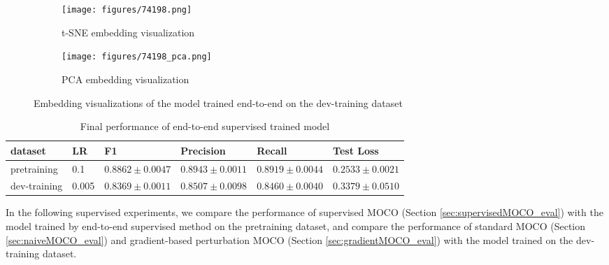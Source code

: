 \documentclass[12pt,twoside]{report}
\begin{document}
\begin{figure}
\centering
    \begin{subfigure}{.45\textwidth}
      \centering
      \texttt{[image: figures/74198.png]}
      \caption{t-SNE embedding visualization}
      \label{fig:small_supervised_tsne}
    \end{subfigure}%
    \begin{subfigure}{.45\textwidth}
      \centering
      \texttt{[image: figures/74198\_pca.png]}
      \caption{PCA embedding visualization}
      \label{fig:small_supervised_pca}
    \end{subfigure}
    \caption{Embedding visualizations of the model trained end-to-end on the dev-training dataset}
    \label{fig:small_supervised_embedding}
\end{figure}



\begin{table}[]
    \centering
    \begin{tabular}{llllll}
    \toprule
    dataset & LR & F1 & Precision & Recall & Test Loss \\
    \midrule
    pretraining & 0.1 & $0.8862 \pm 0.0047$ & $0.8943 \pm 0.0011$ & $0.8919 \pm 0.0044$ & $0.2533 \pm 0.0021$ \\
    dev-training & 0.005 & $0.8369 \pm 0.0011$ & $0.8507 \pm 0.0098$ & $0.8460 \pm 0.0040$ & $0.3379 \pm 0.0510$ \\
    \bottomrule
    \end{tabular}
    \caption{Final performance of end-to-end supervised trained model}
    \label{tab:naive_supervised_final}
\end{table}


In the following supervised experiments, we compare the performance of supervised MOCO (Section \ref{sec:supervisedMOCO_eval}) with the model trained by end-to-end supervised method on the pretraining dataset, and compare the performance of standard MOCO (Section \ref{sec:naiveMOCO_eval}) and gradient-based perturbation MOCO (Section \ref{sec:gradientMOCO_eval}) with the model trained on the dev-training dataset. 
\end{document}
